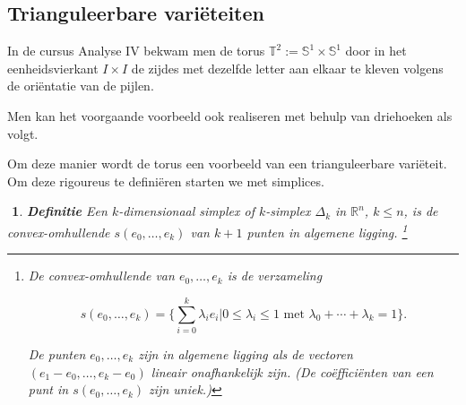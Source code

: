 \documentclass[12pt]{book}
\newtheorem{dfh}[stelh]{$\!\!$}
\newenvironment{df}{\begin{dfh} \em {\bf Definitie }}{\end{dfh}}
\begin{document}
\subsection{Trianguleerbare vari\"eteiten}

In de cursus Analyse IV bekwam men de torus $\mathbb{T}^2 := \mathbb{S}^1 \times \mathbb{S}^1$  door in het eenheidsvierkant $I \times I$ de zijdes met dezelfde letter aan elkaar te kleven volgens de ori\"entatie van de pijlen.  
\begin{center}
\end{center}

Men kan het voorgaande voorbeeld ook realiseren met behulp van driehoeken als volgt.

\begin{center}
\end{center}

Om deze manier wordt de torus een voorbeeld van een trianguleerbare vari\"eteit. Om deze rigoureus te defini\"eren starten we met simplices.


\begin{df} 
Een $k$-{\em dimensionaal simplex} of $k$-{\em simplex} $\Delta_{k}$ in $\mathbb{R}^{n}$, $k\leq n$, is de 
convex-omhullende $s(e_0, \ldots , e_k)$ van $k + 1$ punten in algemene ligging.
\footnote{De {\em convex-omhullende} van $e_0, \ldots , e_k$ is de verzameling 

$$s(e_0, \ldots , e_k)=\{\sum_{i=0}^{k} \lambda_i e_i| 0\leq \lambda_i \leq 1 \mbox{ met } \lambda_0+\cdots +\lambda_k=1\}.$$

De punten $e_0, \ldots , e_k$ zijn in algemene ligging als de vectoren
$(e_1-e_0, \ldots , e_k-e_0)$ lineair onafhankelijk zijn. (De co\"effici\"enten van een punt in $s(e_0, \ldots , e_k)$ zijn uniek.)}
\end{df}
\end{document}
